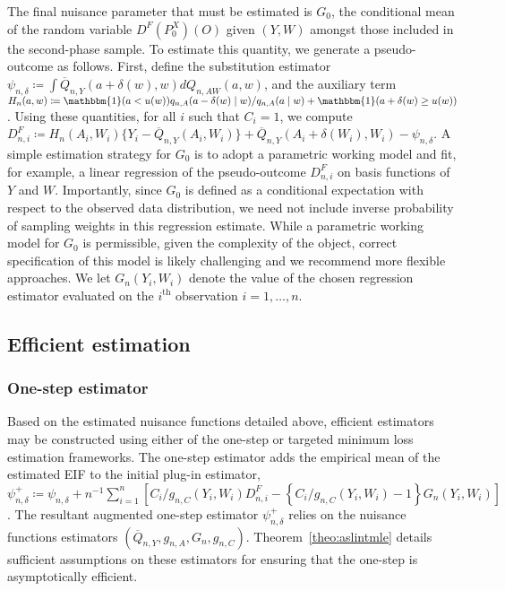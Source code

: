 The final nuisance parameter that must be estimated is $G_0$, the conditional
mean of the random variable $D^F(P_0^X)(O)$ given $(Y,W)$ amongst those included
in the second-phase sample. To estimate this quantity, we generate
a pseudo-outcome as follows. First, define the substitution estimator
$\psi_{n,\delta} \coloneqq \int \overline{Q}_{n,Y}(a + \delta(w), w)
dQ_{n,AW}(a,w)$, and the auxiliary term $H_n(a,w) \coloneqq \mathbbm{1}(a <
u(w)) q_{n,A}(a - \delta(w) \mid w)/q_{n,A}(a \mid w) + \mathbbm{1}(a +
\delta(w) \ge u(w))$.
Using these quantities, for all $i$ such that $C_i = 1$, we compute $D^F_{n,i}
\coloneqq H_n(A_i, W_i) \{Y_i - \overline{Q}_{n,Y}(A_i, W_i)\}
+ \overline{Q}_{n,Y}(A_i + \delta(W_i), W_i) - \psi_{n,\delta}$. 
A simple estimation strategy for $G_0$ is to adopt a parametric working model
and fit, for example, a linear regression of the pseudo-outcome $D^F_{n,i}$ on
basis functions of $Y$ and $W$. Importantly, since $G_0$ is defined as
a conditional expectation with respect to the observed data distribution, we
need not include inverse probability of sampling weights in this regression
estimate. While a parametric working model for $G_0$ is permissible, given the
complexity of the object, correct specification of this model is likely
challenging and we recommend more flexible approaches. We let $G_n(Y_i,W_i)$
denote the value of the chosen regression estimator evaluated on the
$i^\text{th}$ observation $i = 1, \ldots, n$.

\subsection{Efficient estimation}\label{os_tml_est}

\subsubsection{One-step estimator}

Based on the estimated nuisance functions detailed above, efficient estimators
may be constructed using either of the one-step or targeted minimum loss
estimation frameworks. The one-step estimator adds the empirical mean of the
estimated EIF to the initial plug-in estimator, $\psi_{n,\delta}^{+} \coloneqq
\psi_{n,\delta} + n^{-1} \sum_{i=1}^n \left[C_i/g_{n,C}(Y_i,W_i) D^F_{n,i} -
\left\{C_i/g_{n,C}(Y_i,W_i) - 1\right\} G_n(Y_i,W_i) \right]$.
The resultant augmented one-step estimator $\psi_{n,\delta}^{+}$ relies on the
nuisance functions estimators $(\overline{Q}_{n,Y}, g_{n,A}, G_n, g_{n,C})$.
Theorem~\ref{theo:aslintmle} details sufficient assumptions on these estimators
for ensuring that the one-step is asymptotically efficient.

